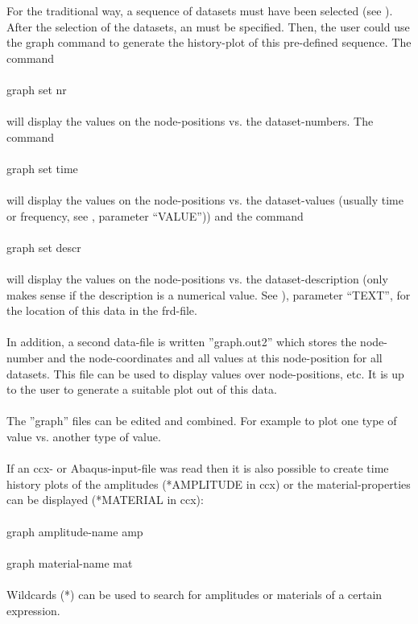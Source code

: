 \documentclass{article}
\begin{document}
For the traditional way, a sequence of datasets must have been selected (see  ). After the selection of the datasets, an  must be specified. Then, the user could use the graph command to generate the history-plot of this pre-defined sequence. The command\\\\graph set nr\\\\will display the values on the node-positions vs. the dataset-numbers. The command\\\\graph set time\\\\will display the values on the node-positions vs. the dataset-values (usually time or frequency, see , parameter ``VALUE'')) and the command\\\\graph set descr\\\\will display the values on the node-positions vs. the dataset-description (only makes sense if the description is a numerical value. See ), parameter ``TEXT'', for the location of this data in the frd-file.\\\\In addition, a second data-file is written ''graph.out2'' which stores the node-number and the node-coordinates and all values at this node-position for all datasets. This file can be used to display values over node-positions, etc. It is up to the user to generate a suitable plot out of this data.\\\\The ''graph'' files can be edited and combined. For example to plot one type of value vs. another type of value.\\\\

If an ccx- or Abaqus-input-file was read then it is also possible to create time history plots of the amplitudes (*AMPLITUDE in ccx) or the material-properties can be displayed (*MATERIAL in ccx):\\\\graph amplitude-name amp\\\\graph material-name mat\\\\Wildcards (*) can be used to search for amplitudes or materials of a certain expression.
\end{document}
